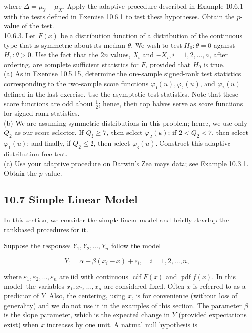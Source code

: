 where $\Delta=\mu_{Y}-\mu_{X}$. Apply the adaptive procedure described in Example 10.6.1 with the tests defined in Exercise 10.6.1 to test these hypotheses. Obtain the $p$-value of the test.\\
10.6.3. Let $F(x)$ be a distribution function of a distribution of the continuous type that is symmetric about its median $\theta$. We wish to test $H_{0}: \theta=0$ against $H_{1}: \theta>0$. Use the fact that the $2 n$ values, $X_{i}$ and $-X_{i}, i=1,2, \ldots, n$, after ordering, are complete sufficient statistics for $F$, provided that $H_{0}$ is true.\\
(a) As in Exercise 10.5.15, determine the one-sample signed-rank test statistics corresponding to the two-sample score functions $\varphi_{1}(u), \varphi_{2}(u)$, and $\varphi_{3}(u)$ defined in the last exercise. Use the asymptotic test statistics. Note that these score functions are odd about $\frac{1}{2}$; hence, their top halves serve as score functions for signed-rank statistics.\\
(b) We are assuming symmetric distributions in this problem; hence, we use only $Q_{2}$ as our score selector. If $Q_{2} \geq 7$, then select $\varphi_{2}(u)$; if $2<Q_{2}<7$, then select $\varphi_{1}(u)$; and finally, if $Q_{2} \leq 2$, then select $\varphi_{3}(u)$. Construct this adaptive distribution-free test.\\
(c) Use your adaptive procedure on Darwin's Zea mays data; see Example 10.3.1. Obtain the $p$-value.

\subsection*{10.7 Simple Linear Model}
In this section, we consider the simple linear model and briefly develop the rankbased procedures for it.

Suppose the responses $Y_{1}, Y_{2}, \ldots, Y_{n}$ follow the model


\begin{equation*}
Y_{i}=\alpha+\beta\left(x_{i}-\bar{x}\right)+\varepsilon_{i}, \quad i=1,2, \ldots, n, \tag{10.7.1}
\end{equation*}


where $\varepsilon_{1}, \varepsilon_{2}, \ldots, \varepsilon_{n}$ are iid with continuous $\operatorname{cdf} F(x)$ and $\operatorname{pdf} f(x)$. In this model, the variables $x_{1}, x_{2}, \ldots, x_{n}$ are considered fixed. Often $x$ is referred to as a predictor of $Y$. Also, the centering, using $\bar{x}$, is for convenience (without loss of generality) and we do not use it in the examples of this section. The parameter $\beta$ is the slope parameter, which is the expected change in $Y$ (provided expectations exist) when $x$ increases by one unit. A natural null hypothesis is


